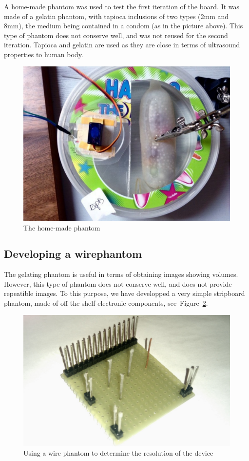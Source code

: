 \documentclass[letterpaper, 10 pt, conference]{ieeeconf} %
\begin{document}
A home-made phantom was used to test the first iteration of the board. It was made of a gelatin phantom, with tapioca inclusions of two types (2mm and 8mm), the medium being contained in a condom (as in the picture above). This type of phantom does not conserve well, and was not reused for the second iteration. Tapioca and gelatin are used as they are close in terms of ultrasound properties to human body.

\begin{figure}%
\centering
\includegraphics[width=.8\linewidth]{phantom}
\caption{The home-made phantom}
\label{fig:phantom}
\end{figure}


\subsection{Developing a wirephantom}

The gelating phantom is useful in terms of obtaining images showing volumes. However, this type of phantom does not conserve well, and does not provide repeatible images. To this purpose, we have developped a very simple stripboard phantom, made of off-the-shelf electronic components, see~Figure~\ref{fig:wirephantom}. 

\begin{figure}%
\centering
\includegraphics[width=.8\linewidth]{wirephantom}
\caption{Using a wire phantom to determine the resolution of the device}
\label{fig:wirephantom}
\end{figure}
\end{document}

